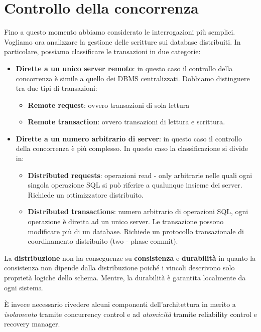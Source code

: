 \section{Controllo della concorrenza}
Fino a questo momento abbiamo considerato le interrogazioni più semplici. Vogliamo
ora analizzare la gestione delle scritture sui database distribuiti. In particolare,
possiamo classificare le transazioni in due categorie:
\begin{itemize}
    \item \textbf{Dirette a un unico server remoto}: in questo caso il controllo
          della concorrenza è simile a quello dei DBMS centralizzati. Dobbiamo
          distinguere tra due tipi di transazioni:
          \begin{itemize}
              \item \textbf{Remote request}: ovvero transazioni di sola lettura
              \item \textbf{Remote transaction}: ovvero transazioni di lettura e scrittura.
          \end{itemize}
    \item \textbf{Dirette a un numero arbitrario di server}: in questo caso il
          controllo della concorrenza è più complesso. In questo caso la
          classificazione si divide in:
          \begin{itemize}
              \item \textbf{Distributed requests}: operazioni read - only
                    arbitrarie nelle quali ogni singola operazione SQL si può riferire
                    a qualunque insieme dei server. Richiede un ottimizzatore distribuito.
              \item \textbf{Distributed transactions}: numero arbitrario di
                    operazioni SQL, ogni operazione è diretta ad un unico server.
                    Le transazione possono modificare più di un database. Richiede
                    un protocollo transazionale di coordinamento distribuito (two
                    - phase commit).
          \end{itemize}
\end{itemize}

La \textbf{distribuzione} non ha conseguenze su \textbf{consistenza} e \textbf{durabilità} in quanto la
consistenza non dipende dalla distribuzione poiché i vincoli descrivono solo
proprietà logiche dello schema. Mentre, la durabilità è garantita localmente da
ogni sistema.

È invece necessario rivedere alcuni componenti dell'architettura in merito a
\textit{isolamento} tramite concurrency control e ad \textit{atomicità} tramite
reliability control e recovery manager.

